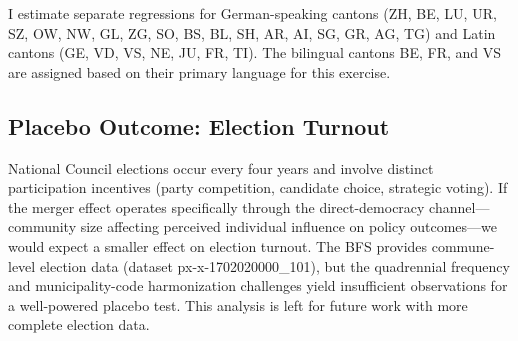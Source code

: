 \documentclass[12pt]{article}
\begin{document}
I estimate separate regressions for German-speaking cantons (ZH, BE, LU, UR, SZ, OW, NW, GL, ZG, SO, BS, BL, SH, AR, AI, SG, GR, AG, TG) and Latin cantons (GE, VD, VS, NE, JU, FR, TI). The bilingual cantons BE, FR, and VS are assigned based on their primary language for this exercise.

\subsection{Placebo Outcome: Election Turnout}

National Council elections occur every four years and involve distinct participation incentives (party competition, candidate choice, strategic voting). If the merger effect operates specifically through the direct-democracy channel---community size affecting perceived individual influence on policy outcomes---we would expect a smaller effect on election turnout. The BFS provides commune-level election data (dataset px-x-1702020000\_101), but the quadrennial frequency and municipality-code harmonization challenges yield insufficient observations for a well-powered placebo test. This analysis is left for future work with more complete election data.
\end{document}

